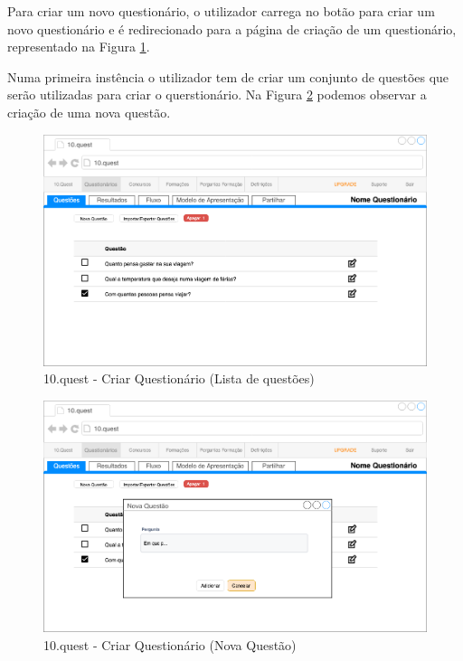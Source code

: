 Para criar um novo questionário, o utilizador carrega no botão para criar um novo questionário e é redirecionado para a página de criação de um questionário, representado na Figura \ref{10q-questoes}.

Numa primeira instência o utilizador tem de criar um conjunto de questões que serão utilizadas para criar o querstionário. Na Figura \ref{10q-Nquestao} podemos observar a criação de uma nova questão.

\clearpage


\mbox{}
\begin{figure}[ht!]
	\begin{center}
		\includegraphics[width=1\textwidth]{img/prototipos/13.png}
		\caption{10.quest - Criar Questionário (Lista de questões)}
		\label{10q-questoes}
	\end{center}
\end{figure}

\begin{figure}[ht!]
	\begin{center}
		\includegraphics[width=1\textwidth]{img/prototipos/14.png}
		\caption{10.quest - Criar Questionário (Nova Questão) }
		\label{10q-Nquestao}
	\end{center}
\end{figure}
\newpage

